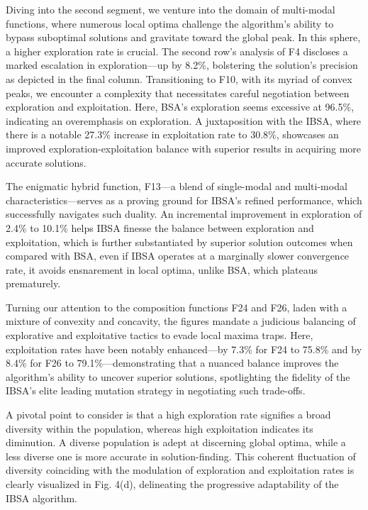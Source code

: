 \documentclass{article} %
\begin{document}
Diving into the second segment, we venture into the domain of multi-modal functions, where numerous local optima challenge the algorithm's ability to bypass suboptimal solutions and gravitate toward the global peak. In this sphere, a higher exploration rate is crucial. The second row's analysis of F4 discloses a marked escalation in exploration---up by 8.2\%, bolstering the solution's precision as depicted in the final column. Transitioning to F10, with its myriad of convex peaks, we encounter a complexity that necessitates careful negotiation between exploration and exploitation. Here, BSA's exploration seems excessive at 96.5\%, indicating an overemphasis on exploration. A juxtaposition with the IBSA, where there is a notable 27.3\% increase in exploitation rate to 30.8\%, showcases an improved exploration-exploitation balance with superior results in acquiring more accurate solutions.

The enigmatic hybrid function, F13---a blend of single-modal and multi-modal characteristics---serves as a proving ground for IBSA's refined performance, which successfully navigates such duality. An incremental improvement in exploration of 2.4\% to 10.1\% helps IBSA finesse the balance between exploration and exploitation, which is further substantiated by superior solution outcomes when compared with BSA, even if IBSA operates at a marginally slower convergence rate, it avoids ensnarement in local optima, unlike BSA, which plateaus prematurely.

Turning our attention to the composition functions F24 and F26, laden with a mixture of convexity and concavity, the figures mandate a judicious balancing of explorative and exploitative tactics to evade local maxima traps. Here, exploitation rates have been notably enhanced---by 7.3\% for F24 to 75.8\% and by 8.4\% for F26 to 79.1\%---demonstrating that a nuanced balance improves the algorithm's ability to uncover superior solutions, spotlighting the fidelity of the IBSA's elite leading mutation strategy in negotiating such trade-offs.

A pivotal point to consider is that a high exploration rate signifies a broad diversity within the population, whereas high exploitation indicates its diminution. A diverse population is adept at discerning global optima, while a less diverse one is more accurate in solution-finding. This coherent fluctuation of diversity coinciding with the modulation of exploration and exploitation rates is clearly visualized in Fig. 4(d), delineating the progressive adaptability of the IBSA algorithm.
\end{document}
